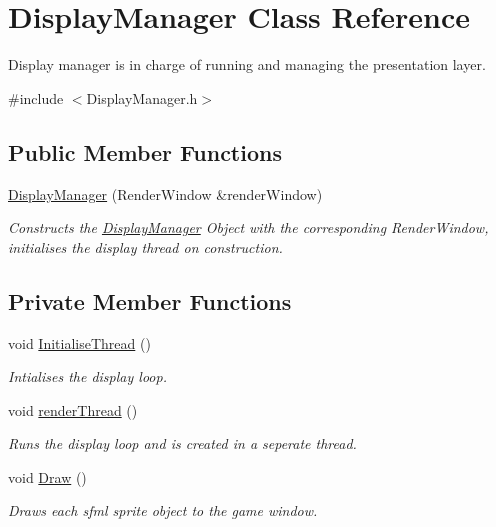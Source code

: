 \hypertarget{class_display_manager}{}\section{Display\+Manager Class Reference}
\label{class_display_manager}


Display manager is in charge of running and managing the presentation layer.  




{\ttfamily \#include $<$Display\+Manager.\+h$>$}

\subsection*{Public Member Functions}
\begin{DoxyCompactItemize}
\item 
\hyperlink{class_display_manager_a5cae0a0f81cbd2457eca8d35733a0516}{Display\+Manager} (Render\+Window \&render\+Window)
\begin{DoxyCompactList}\small\item\em Constructs the \hyperlink{class_display_manager}{Display\+Manager} Object with the corresponding Render\+Window, initialises the display thread on construction. \end{DoxyCompactList}\end{DoxyCompactItemize}
\subsection*{Private Member Functions}
\begin{DoxyCompactItemize}
\item 
\mbox{\label{class_display_manager_ab1c3eaf2694410423b6b1eca6a58436f}} 
void \hyperlink{class_display_manager_ab1c3eaf2694410423b6b1eca6a58436f}{Initialise\+Thread} ()
\begin{DoxyCompactList}\small\item\em Intialises the display loop. \end{DoxyCompactList}\item 
\mbox{\label{class_display_manager_a79b7a390f3a2a09e7209d271e589e705}} 
void \hyperlink{class_display_manager_a79b7a390f3a2a09e7209d271e589e705}{render\+Thread} ()
\begin{DoxyCompactList}\small\item\em Runs the display loop and is created in a seperate thread. \end{DoxyCompactList}\item 
\mbox{\label{class_display_manager_a59cef8980a225ca13757e362a92891d1}} 
void \hyperlink{class_display_manager_a59cef8980a225ca13757e362a92891d1}{Draw} ()
\begin{DoxyCompactList}\small\item\em Draws each sfml sprite object to the game window. \end{DoxyCompactList}\end{DoxyCompactItemize}
